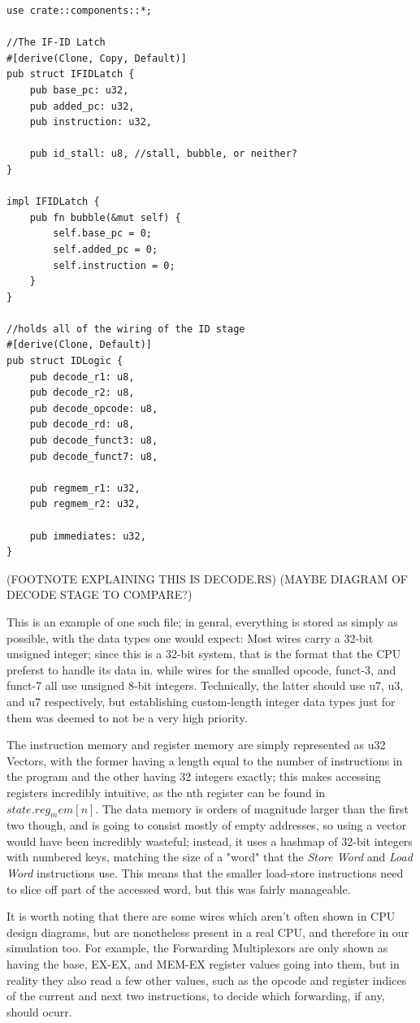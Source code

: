 \documentclass[12pt,twoside]{reedthesis}
\begin{document}
\begin{lstlisting}
use crate::components::*;

//The IF-ID Latch
#[derive(Clone, Copy, Default)]
pub struct IFIDLatch {
    pub base_pc: u32,
    pub added_pc: u32,
    pub instruction: u32,

    pub id_stall: u8, //stall, bubble, or neither?
}

impl IFIDLatch {
    pub fn bubble(&mut self) {
        self.base_pc = 0;
        self.added_pc = 0;
        self.instruction = 0;
    }
}

//holds all of the wiring of the ID stage
#[derive(Clone, Default)]
pub struct IDLogic {
    pub decode_r1: u8,
    pub decode_r2: u8,
    pub decode_opcode: u8,
    pub decode_rd: u8,
    pub decode_funct3: u8,
    pub decode_funct7: u8,

    pub regmem_r1: u32,
    pub regmem_r2: u32,

    pub immediates: u32,
}
\end{lstlisting}
(FOOTNOTE EXPLAINING THIS IS DECODE.RS)
(MAYBE DIAGRAM OF DECODE STAGE TO COMPARE?)

This is an example of one such file; in genral, everything is stored as simply as possible, with the data types one would expect: Most wires carry a 32-bit unsigned integer; since this is a 32-bit system, that is the format that the CPU preferst to handle its data in. while wires for the smalled opcode, funct-3, and funct-7 all use unsigned 8-bit integers. Technically, the latter should use u7, u3, and u7 respectively, but establishing custom-length integer data types just for them was deemed to not be a very high priority.

The instruction memory and register memory are simply represented as u32 Vectors, with the former having a length equal to the number of instructions in the program and the other having 32 integers exactly; this makes accessing registers incredibly intuitive, as the nth register can be found in $state.reg_mem[n]$. The data memory is orders of magnitude larger than the first two though, and is going to consist mostly of empty addresses, so using a vector would have been incredibly wasteful; instead, it uses a hashmap of 32-bit integers with numbered keys, matching the size of a "word" that the \textit{Store Word} and \textit{Load Word} instructions use. This means that the smaller load-store instructions need to slice off part of the accessed word, but this was fairly manageable.

It is worth noting that there are some wires which aren't often shown in CPU design diagrams, but are nonetheless present in a real CPU, and therefore in our simulation too. For example, the Forwarding Multiplexors are only shown as having the base, EX-EX, and MEM-EX register values going into them, but in reality they also read a few other values, such as the opcode and register indices of the current and next two instructions, to decide which forwarding, if any, should ocurr.
\end{document}
